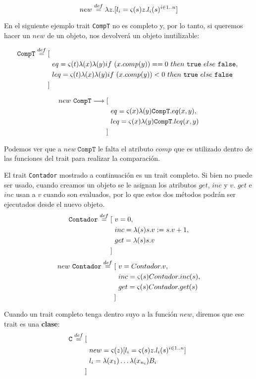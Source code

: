 $$new \overset{def}{=} \lambda z. [l_i = \varsigma(s)z.l_i(s)^{i\in 1..n}]$$

En el siguiente ejemplo trait \texttt{CompT} no es completo y, por lo tanto, si queremos hacer un $new$ de un objeto, nos devolverá un objeto inutilizable:

\begin{align*}
	\texttt{CompT}\overset{def}{=} [~& \\ &eq = \varsigma(t)\lambda(x)\lambda(y)if~ (x.comp(y)) == 0~ then~ \texttt{true}~ else~ \texttt{false},~\\
	&leq = \varsigma(t)\lambda(x)\lambda(y)if~ (x.comp(y)) < 0~ then~ \texttt{true}~ else~ \texttt{false} \\
	]~&
\end{align*}

\begin{align*}
new~\texttt{CompT}\longrightarrow [~& \\ &eq = \varsigma(x)\lambda(y)\texttt{CompT}.eq(x,y),~\\
&leq = \varsigma(x)\lambda(y)\texttt{CompT}.leq(x,y) \\
]~&
\end{align*}

Podemos ver que a $new~\texttt{CompT}$ le falta el atributo $comp$ que es utilizado dentro de las funciones del trait para realizar la comparación.

El trait \texttt{Contador} mostrado a continuación es un trait completo. Si bien no puede ser usado, cuando creamos un objeto se le asignan los atributos $get$, $inc$ y $v$. $get$ e $inc$ usan a $v$ cuando son evaluados, por lo que estos dos métodos podrán ser ejecutados desde el nuevo objeto.
\begin{align*}
\texttt{Contador}\overset{def}{=} [~& v = 0, \\
 & inc = \lambda(s) s.v := s.v + 1, \\
 & get = \lambda(s) s.v \\
 ]~&  \\
\end{align*}
\begin{align*}
new~\texttt{Contador}\overset{def}{=} [~& v = Contador.v, \\
 & inc = \varsigma(s) Contador.inc(s), \\
 & get = \varsigma(s) Contador.get(s) \\
 ]~&  \\
\end{align*}

\newpage
Cuando un trait completo tenga dentro suyo a la función $new$, diremos que ese trait es una \textbf{clase}:
\begin{align*}
\texttt{C}\overset{def}{=} [~& \\ &new = \varsigma(z)[l_i = \varsigma(s)z.l_i(s)^{i\in 1..n}]~\\
&l_i = \lambda(x_{1})\dots\lambda(x_{n_i})B_i \\
]~&
\end{align*}
